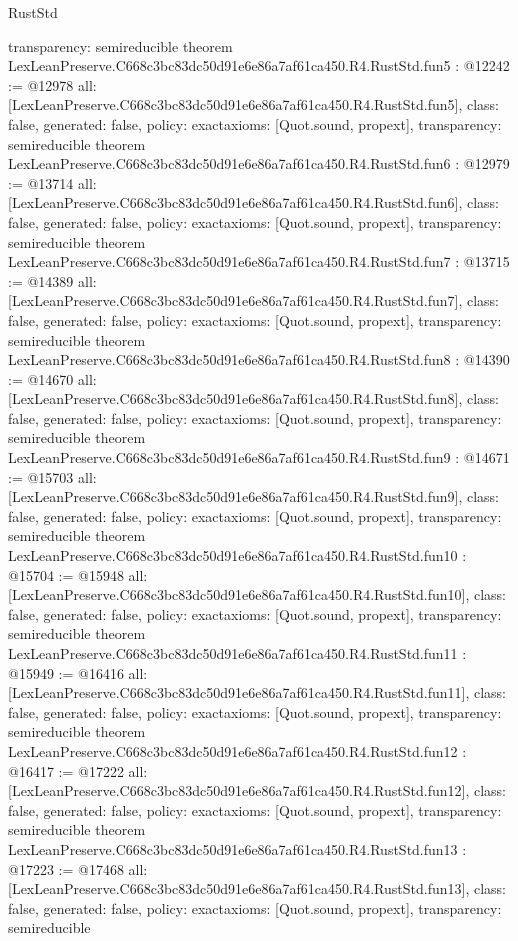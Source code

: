 \begin{lexlean}{RustStd}
\begin{coremodule}
{  transparency: semireducible
}
theorem LexLeanPreserve.C668c3bc83dc50d91e6e86a7af61ca450.R4.RustStd.fun5 : @12242 := @12978 {
  all: [LexLeanPreserve.C668c3bc83dc50d91e6e86a7af61ca450.R4.RustStd.fun5],
  class: false,
  generated: false,
  policy: exact{axioms: [Quot.sound, propext]},
  transparency: semireducible
}
theorem LexLeanPreserve.C668c3bc83dc50d91e6e86a7af61ca450.R4.RustStd.fun6 : @12979 := @13714 {
  all: [LexLeanPreserve.C668c3bc83dc50d91e6e86a7af61ca450.R4.RustStd.fun6],
  class: false,
  generated: false,
  policy: exact{axioms: [Quot.sound, propext]},
  transparency: semireducible
}
theorem LexLeanPreserve.C668c3bc83dc50d91e6e86a7af61ca450.R4.RustStd.fun7 : @13715 := @14389 {
  all: [LexLeanPreserve.C668c3bc83dc50d91e6e86a7af61ca450.R4.RustStd.fun7],
  class: false,
  generated: false,
  policy: exact{axioms: [Quot.sound, propext]},
  transparency: semireducible
}
theorem LexLeanPreserve.C668c3bc83dc50d91e6e86a7af61ca450.R4.RustStd.fun8 : @14390 := @14670 {
  all: [LexLeanPreserve.C668c3bc83dc50d91e6e86a7af61ca450.R4.RustStd.fun8],
  class: false,
  generated: false,
  policy: exact{axioms: [Quot.sound, propext]},
  transparency: semireducible
}
theorem LexLeanPreserve.C668c3bc83dc50d91e6e86a7af61ca450.R4.RustStd.fun9 : @14671 := @15703 {
  all: [LexLeanPreserve.C668c3bc83dc50d91e6e86a7af61ca450.R4.RustStd.fun9],
  class: false,
  generated: false,
  policy: exact{axioms: [Quot.sound, propext]},
  transparency: semireducible
}
theorem LexLeanPreserve.C668c3bc83dc50d91e6e86a7af61ca450.R4.RustStd.fun10 : @15704 := @15948 {
  all: [LexLeanPreserve.C668c3bc83dc50d91e6e86a7af61ca450.R4.RustStd.fun10],
  class: false,
  generated: false,
  policy: exact{axioms: [Quot.sound, propext]},
  transparency: semireducible
}
theorem LexLeanPreserve.C668c3bc83dc50d91e6e86a7af61ca450.R4.RustStd.fun11 : @15949 := @16416 {
  all: [LexLeanPreserve.C668c3bc83dc50d91e6e86a7af61ca450.R4.RustStd.fun11],
  class: false,
  generated: false,
  policy: exact{axioms: [Quot.sound, propext]},
  transparency: semireducible
}
theorem LexLeanPreserve.C668c3bc83dc50d91e6e86a7af61ca450.R4.RustStd.fun12 : @16417 := @17222 {
  all: [LexLeanPreserve.C668c3bc83dc50d91e6e86a7af61ca450.R4.RustStd.fun12],
  class: false,
  generated: false,
  policy: exact{axioms: [Quot.sound, propext]},
  transparency: semireducible
}
theorem LexLeanPreserve.C668c3bc83dc50d91e6e86a7af61ca450.R4.RustStd.fun13 : @17223 := @17468 {
  all: [LexLeanPreserve.C668c3bc83dc50d91e6e86a7af61ca450.R4.RustStd.fun13],
  class: false,
  generated: false,
  policy: exact{axioms: [Quot.sound, propext]},
  transparency: semireducible
}
\end{coremodule}
\end{lexlean}
